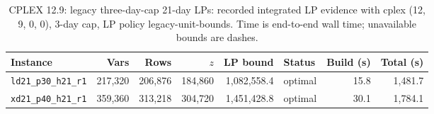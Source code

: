 \begin{table}[htbp]
\centering\scriptsize
\caption{CPLEX 12.9: legacy three-day-cap 21-day LPs: recorded integrated LP evidence with cplex (12, 9, 0, 0), 3-day cap, LP policy legacy-unit-bounds. Time is end-to-end wall time; unavailable bounds are dashes.}
\label{tab:validated_lp_2}
\begin{tabular}{lrrrrlrr}
\toprule
Instance & Vars & Rows & $z$ & LP bound & Status & Build (s) & Total (s) \\
\midrule
\texttt{ld21\_p30\_h21\_r1} & 217,320 & 206,876 & 184,860 & 1,082,558.4 & optimal & 15.8 & 1,481.7 \\
\texttt{xd21\_p40\_h21\_r1} & 359,360 & 313,218 & 304,720 & 1,451,428.8 & optimal & 30.1 & 1,784.1 \\
\bottomrule
\end{tabular}
\end{table}
